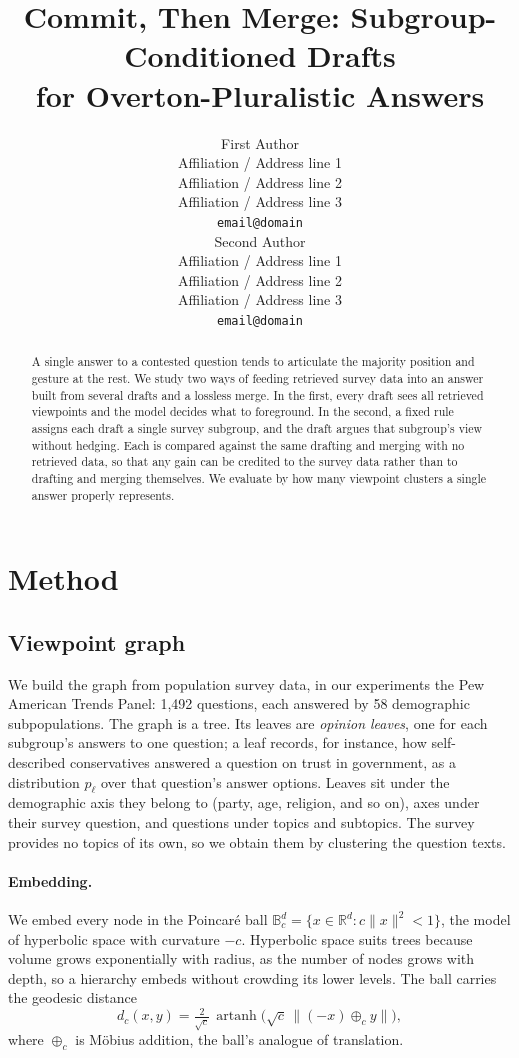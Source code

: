 \documentclass[11pt]{article}
\title{Commit, Then Merge: Subgroup-Conditioned Drafts\\for Overton-Pluralistic Answers}
\author{First Author \\
  Affiliation / Address line 1 \\
  Affiliation / Address line 2 \\
  Affiliation / Address line 3 \\
  \texttt{email@domain} \\\And
  Second Author \\
  Affiliation / Address line 1 \\
  Affiliation / Address line 2 \\
  Affiliation / Address line 3 \\
  \texttt{email@domain} \\}
\begin{document}
\maketitle
\begin{abstract}
A single answer to a contested question tends to articulate the majority
position and gesture at the rest. We study two ways of feeding retrieved survey
data into an answer built from several drafts and a lossless merge. In the
first, every draft sees all retrieved viewpoints and the model decides what to
foreground. In the second, a fixed rule assigns each draft a single survey
subgroup, and the draft argues that subgroup's view without hedging. Each is
compared against the same drafting and merging with no retrieved data, so that
any gain can be credited to the survey data rather than to drafting and merging
themselves. We evaluate by how many viewpoint clusters a single answer properly
represents.
\end{abstract}

\section{Method}

\subsection{Viewpoint graph}

We build the graph from population survey data, in our experiments the Pew
American Trends Panel: 1{,}492 questions, each answered by 58 demographic
subpopulations. The graph is a tree. Its leaves are \emph{opinion leaves}, one
for each subgroup's answers to one question; a leaf records, for instance, how
self-described conservatives answered a question on trust in government, as a
distribution $p_\ell$ over that question's answer options. Leaves sit under the
demographic axis they belong to (party, age, religion, and so on), axes under
their survey question, and questions under topics and subtopics. The survey
provides no topics of its own, so we obtain them by clustering the question
texts.

\paragraph{Embedding.} We embed every node in the Poincar\'e ball
$\mathbb{B}^d_c = \{x \in \mathbb{R}^d : c\lVert x\rVert^2 < 1\}$, the model of
hyperbolic space with curvature $-c$. Hyperbolic space suits trees because
volume grows exponentially with radius, as the number of nodes grows with depth,
so a hierarchy embeds without crowding its lower levels. The ball carries the
geodesic distance
\begin{equation}
  d_c(x, y) = \tfrac{2}{\sqrt{c}}\,
  \operatorname{artanh}\!\bigl(\sqrt{c}\,\lVert (-x) \oplus_c y \rVert\bigr),
\end{equation}
where $\oplus_c$ is M\"obius addition, the ball's analogue of translation.
\end{document}
